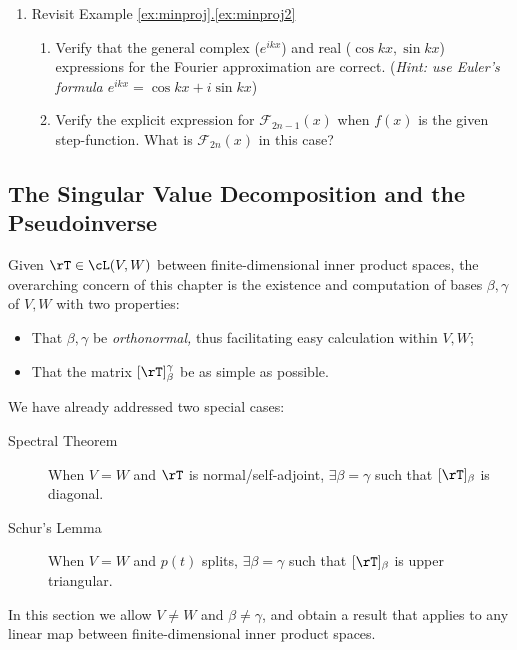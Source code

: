 \begin{exercises}
\begin{enumerate}
	
	\item Revisit Example \hyperref[ex:minproj2]{\ref*{ex:minproj}.\ref*{ex:minproj2}}
	\begin{enumerate}
	  \item Verify that the general complex ($e^{ikx}$) and real ($\cos kx,\sin kx$) expressions for the Fourier approximation are correct.\smallbreak
	  (\emph{Hint: use Euler's formula $e^{ikx}=\cos kx+i\sin kx$})
	  \item Verify the explicit expression for $\mathcal F_{2n-1}(x)$ when $f(x)$ is the given step-function. What is $\mathcal F_{2n}(x)$ in this case?
	\end{enumerate}
\end{enumerate}
\end{exercises}
	
	\clearpage


\subsection{The Singular Value Decomposition and the Pseudoinverse}

Given $\rT\in\cL(V,W)$ between finite-dimensional inner product spaces, the overarching concern of this chapter is the existence and computation of bases $\beta,\gamma$ of $V,W$ with two properties:
\begin{itemize}
  \item That $\beta,\gamma$ be \emph{orthonormal,} thus facilitating easy calculation within $V,W$;
  \item That the matrix $[\rT]_\beta^\gamma$ be as simple as possible.
\end{itemize}

We have already addressed two special cases:
\begin{description}
	\item[Spectral Theorem] When $V=W$ and $\rT$ is normal/self-adjoint, $\exists\beta=\gamma$ such that $[\rT]_\beta$ is diagonal.
	\item[Schur's Lemma] When $V=W$ and $p(t)$ splits, $\exists\beta=\gamma$ such that $[\rT]_\beta$ is upper triangular.	
\end{description}

In this section we allow $V\neq W$ and $\beta\neq\gamma$, and obtain a result that applies to any linear map between finite-dimensional inner product spaces.

